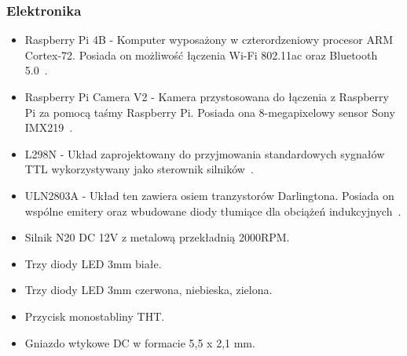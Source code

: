 \subsubsection{Elektronika}
    \begin{itemize}
        \item Raspberry Pi 4B - Komputer wyposażony w czterordzeniowy procesor ARM Cortex-72. Posiada on możliwość łączenia Wi-Fi 802.11ac oraz Bluetooth 5.0~\cite{malina}.
        \item Raspberry Pi Camera V2 - Kamera przystosowana do łączenia z Raspberry Pi za pomocą taśmy Raspberry Pi. Posiada ona 8-megapixelowy sensor Sony IMX219~\cite{malina}.
        \item L298N - Układ zaprojektowany do przyjmowania standardowych sygnałów TTL wykorzystywany jako sterownik silników~\cite{L298}.
        \item ULN2803A - Układ ten zawiera osiem tranzystorów Darlingtona. Posiada on wspólne emitery oraz wbudowane diody tłumiące dla obciążeń indukcyjnych~\cite{ULN2803a}.
        \item Silnik N20 DC 12V z metalową przekładnią 2000RPM.
        \item Trzy diody LED 3mm białe.
        \item Trzy diody LED 3mm czerwona, niebieska, zielona.
        \item Przycisk monostabliny THT.
        \item Gniazdo wtykowe DC w formacie 5,5 x 2,1 mm.
    \end{itemize}

